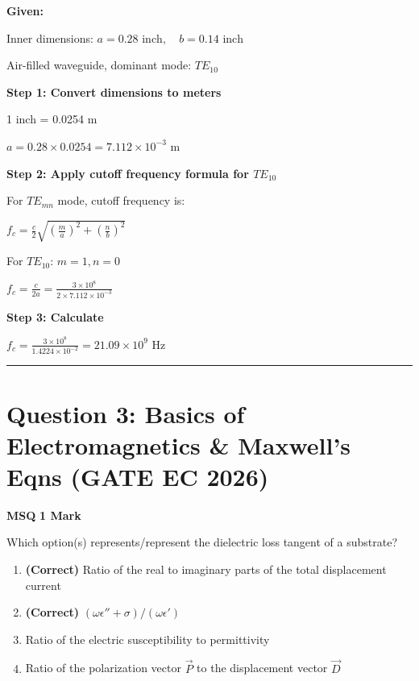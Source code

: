 \documentclass[11pt,a4paper]{article}
\begin{document}
\begin{tcolorbox}[solbox, title=Detailed Solution -- Question 2]
\textbf{Given:}

Inner dimensions: $a = 0.28 \text{ inch},\quad b = 0.14 \text{ inch}$

Air-filled waveguide, dominant mode: $TE_{10}$

\textbf{Step 1: Convert dimensions to meters}

1 inch = 0.0254 m

$a = 0.28 \times 0.0254 = 7.112 \times 10^{-3} \text{ m}$

\textbf{Step 2: Apply cutoff frequency formula for $TE_{10}$}

For $TE_{mn}$ mode, cutoff frequency is:

$f_c = \frac{c}{2}\sqrt{\left(\frac{m}{a}\right)^2 + \left(\frac{n}{b}\right)^2}$

For $TE_{10}$: $m=1, n=0$

$f_c = \frac{c}{2a} = \frac{3 \times 10^8}{2 \times 7.112 \times 10^{-3}}$

\textbf{Step 3: Calculate}

$f_c = \frac{3 \times 10^8}{1.4224 \times 10^{-2}} = 21.09 \times 10^9 \text{ Hz}$
\end{tcolorbox}

\vspace{1.5em}
\hrule
\vspace{1.5em}

\section*{Question 3: Basics of Electromagnetics \& Maxwell's Eqns (GATE EC 2026)}
\noindent \textbf{\color{primary}MSQ} \hfill \textbf{\color{secondary}1 Mark}


\noindent Which option(s) represents/represent the dielectric loss tangent of a substrate?


\begin{enumerate}[label=(\Alph*)]
    \item \textbf{(Correct)} Ratio of the real to imaginary parts of the total displacement current
    \item \textbf{(Correct)} $(\omega\epsilon'' + \sigma)/(\omega\epsilon')$
    \item Ratio of the electric susceptibility to permittivity
    \item Ratio of the polarization vector $\vec{P}$ to the displacement vector $\vec{D}$
\end{enumerate}
\end{document}
